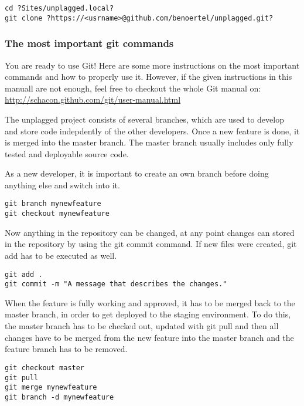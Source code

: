 \begin{lstlisting}[caption=Cloning a repository]
cd ?Sites/unplagged.local?
git clone ?https://<usrname>@github.com/benoertel/unplagged.git?
\end{lstlisting}

\subsubsection{The most important git commands}

You are ready to use Git! Here are some more instructions on the most important commands and how to properly use it. 
However, if the given instructions in this manuall are not enough, feel free to checkout the whole Git manual on: 
\url{http://schacon.github.com/git/user-manual.html}

The unplagged project consists of several branches, which are used to develop and store code indepdently of the other 
developers. Once a new feature is done, it is merged into the master branch. The master branch usually includes only 
fully tested and deployable source code. 

As a new developer, it is important to create an own branch before doing anything else and switch into it.

\begin{lstlisting}[caption=Creating branches]
git branch mynewfeature
git checkout mynewfeature
\end{lstlisting}

Now anything in the repository can be changed, at any point changes can stored in the repository by using the git commit 
command. If new files were created, git add has to be executed as well.

\begin{lstlisting}[caption=Creating branches]
git add .
git commit -m "A message that describes the changes."
\end{lstlisting}

When the feature is fully working and approved, it has to be merged back to the master branch, in order to get deployed 
to the staging environment. To do this, the master branch has to be checked out, updated with git pull and then all changes
have to be merged from the new feature into the master branch and the feature branch has to be removed.

\begin{lstlisting}[caption=Creating branches]
git checkout master
git pull
git merge mynewfeature
git branch -d mynewfeature
\end{lstlisting}

